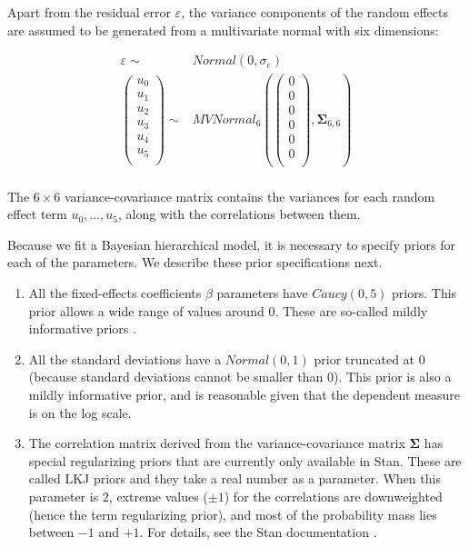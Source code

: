 \documentclass[12pt]{article}
\begin{document}
Apart from the residual error $\varepsilon$, the variance components of the random effects are assumed to be generated from a multivariate normal with six dimensions:

\begin{equation}
\begin{split}
\varepsilon \sim & Normal(0,\sigma_e)\\
\left(
\begin{matrix}
u_0\\
u_1\\
u_2\\
u_3\\
u_4\\
u_5\\
\end{matrix}
\right)
\sim &
MVNormal_6\left( 
\left(
\begin{matrix}
0\\
0\\
0\\
0\\
0\\
0\\
\end{matrix}
\right)
,
\mathbf{\Sigma}_{6,6}
\right)\\
\end{split}
\end{equation}

The $6\times 6$ variance-covariance matrix contains the variances for each random effect term $u_{0},\dots, u_{5}$, along with the correlations between them. 

Because we fit a Bayesian hierarchical model, it is necessary to specify priors for each of the parameters. We describe these prior specifications next.

\begin{enumerate}
\item All the fixed-effects coefficients $\beta$ parameters have $Caucy(0,5)$ priors.  This prior allows a wide range of values around $0$. These are so-called mildly informative priors \cite{Gelman14}.
\item All the standard deviations have a $Normal(0,1)$ prior truncated at 0 (because standard deviations cannot be smaller than 0). This prior is also a mildly informative prior, and is reasonable given that the dependent measure is on the log scale.
\item The correlation matrix derived from the variance-covariance matrix $\mathbf{\Sigma}$ has special regularizing priors that are currently only available in Stan. These are called LKJ priors and they take a real number as a parameter. When this parameter is $2$, extreme values ($\pm 1$) for the correlations are  downweighted (hence the term regularizing prior), and most of the probability mass lies between $-1$ and $+1$. For details, see the Stan documentation \cite{stan-manual:2017}.
\end{enumerate}
\end{document}
